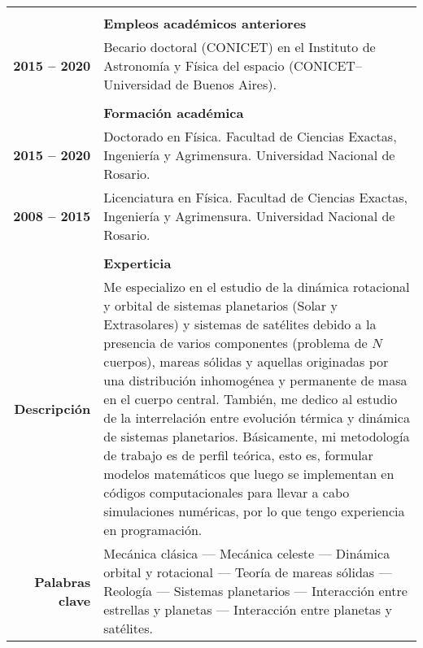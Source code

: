 \documentclass[12pt,a4paper]{article}
\begin{document}
\begin{longtable}[t]{r p{12cm}}
& \\
& \textbf{Empleos académicos anteriores} \\ 
\cline{2-2}
\textbf{2015 -- 2020} & Becario doctoral (CONICET) en el Instituto de Astronomía y Física del espacio (CONICET--Universidad de Buenos Aires). \\

 & \\
 & \textbf{Formación académica} \\
\cline{2-2}
\textbf{2015 -- 2020} & Doctorado en Física. Facultad de Ciencias Exactas, Ingeniería y Agrimensura. Universidad Nacional de Rosario. \\
\textbf{2008 -- 2015} & Licenciatura en Física. Facultad de Ciencias Exactas, Ingeniería y Agrimensura. Universidad Nacional de Rosario. \\

& \\
& \textbf{Experticia} \\
\cline{2-2}
\textbf{Descripción} & Me especializo en el estudio de la dinámica rotacional y orbital de sistemas planetarios (Solar y Extrasolares) y sistemas de satélites debido a la presencia de varios componentes (problema de $N$ cuerpos), mareas sólidas y aquellas originadas por una distribución inhomogénea y permanente de masa en el cuerpo central. También, me dedico al estudio de la interrelación entre evolución térmica y dinámica de sistemas planetarios. Básicamente, mi metodología de trabajo es de perfil teórica, esto es, formular modelos matemáticos que luego se implementan en códigos computacionales para llevar a cabo simulaciones numéricas, por lo que tengo experiencia en programación.\\
\textbf{Palabras clave} & Mecánica clásica --- Mecánica celeste --- Dinámica orbital y rotacional --- Teoría de mareas sólidas --- Reología --- Sistemas planetarios --- Interacción entre estrellas y planetas --- Interacción entre planetas y satélites. \\


\end{longtable}
\end{document}
